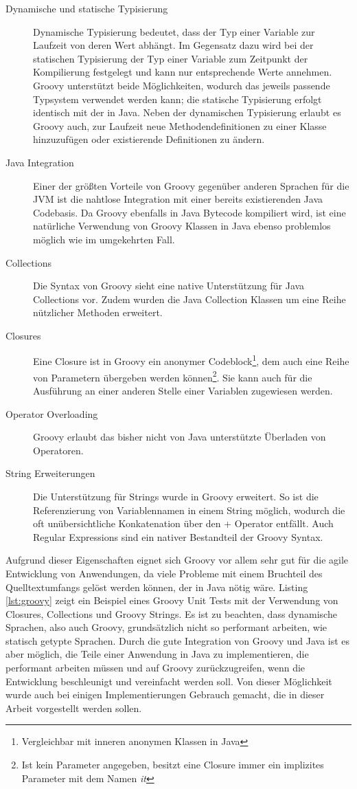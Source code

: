 \begin{description}
  \item[Dynamische und statische Typisierung] Dynamische Typisierung bedeutet,
  dass der Typ einer Variable zur Laufzeit von deren Wert abhängt. Im Gegensatz
  dazu wird bei der statischen Typisierung der Typ einer Variable zum Zeitpunkt
  der Kompilierung festgelegt und kann nur entsprechende Werte annehmen. Groovy
  unterstützt beide Möglichkeiten, wodurch das jeweils passende Typsystem
  verwendet werden kann; die statische Typisierung erfolgt identisch mit der in
  Java. Neben der dynamischen Typisierung erlaubt es Groovy auch, zur Laufzeit
  neue Methodendefinitionen zu einer Klasse hinzuzufügen oder existierende
  Definitionen zu ändern.
  \item[Java Integration] Einer der größten Vorteile von Groovy
  gegenüber anderen Sprachen für die \ac{JVM} ist die nahtlose Integration mit
  einer bereits existierenden Java Codebasis. Da Groovy ebenfalls in Java
  Bytecode kompiliert wird, ist eine natürliche Verwendung von Groovy Klassen
  in Java ebenso problemlos möglich wie im umgekehrten Fall.
  \item[Collections] Die Syntax von Groovy sieht eine native Unterstützung für
  Java Collections vor. Zudem wurden die Java Collection Klassen um eine Reihe
  nützlicher Methoden erweitert.
  \item[Closures] Eine Closure ist in Groovy ein anonymer
  Codeblock\footnote{Vergleichbar mit inneren anonymen Klassen in Java}, dem auch
  eine Reihe von Parametern übergeben werden können\footnote{Ist kein Parameter
  angegeben, besitzt eine Closure immer ein implizites Parameter mit dem Namen
  \emph{it}}. Sie kann auch für die Ausführung an einer anderen Stelle
  einer Variablen zugewiesen werden.
  \item[Operator Overloading] Groovy erlaubt das bisher nicht von Java
  unterstützte Überladen von Operatoren.
  \item[String Erweiterungen] Die Unterstützung für Strings wurde in Groovy
  erweitert. So ist die Referenzierung von Variablennamen in einem String
  möglich, wodurch die oft unübersichtliche Konkatenation über den + Operator
  entfällt. Auch Regular Expressions sind ein nativer Bestandteil der Groovy
  Syntax.
\end{description}

Aufgrund dieser Eigenschaften eignet sich Groovy vor allem sehr gut für die agile
Entwicklung von Anwendungen, da viele Probleme mit einem Bruchteil des
Quelltextumfangs gelöst werden können, der in Java nötig wäre. Listing
\ref{lst:groovy} zeigt ein Beispiel eines Groovy Unit Tests mit der Verwendung
von Closures, Collections und Groovy Strings. Es ist zu beachten, dass dynamische
Sprachen, also auch Groovy, grundsätzlich nicht so performant arbeiten, wie
statisch getypte Sprachen. Durch die gute Integration von Groovy und Java ist es
aber möglich, die Teile einer Anwendung in Java zu implementieren, die
performant arbeiten müssen und auf Groovy zurückzugreifen, wenn die Entwicklung beschleunigt
und vereinfacht werden soll. Von dieser Möglichkeit wurde auch bei
einigen Implementierungen Gebrauch gemacht, die in dieser Arbeit vorgestellt
werden sollen.

